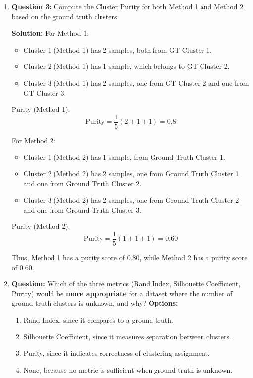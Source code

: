 \documentclass{article}
\begin{document}
\begin{enumerate}
Hence, the silhouette scores for all samples are shown above.

    \item \textbf{Question 3:} \newline
    Compute the Cluster Purity for both Method 1 and Method 2 based on the ground truth clusters.
    
    \textbf{Solution:} \newline
    For Method 1:
    \begin{itemize}
        \item Cluster 1 (Method 1) has 2 samples, both from GT Cluster 1.
        \item Cluster 2 (Method 1) has 1 sample, which belongs to GT Cluster 2.
        \item Cluster 3 (Method 1) has 2 samples, one from GT Cluster 2 and one from GT Cluster 3.
    \end{itemize}
    
    Purity (Method 1):
    \[
    \text{Purity} = \frac{1}{5} (2 + 1 + 1) = 0.8
    \]
    
    For Method 2:
    \begin{itemize}
        \item Cluster 1 (Method 2) has 1 sample, from Ground Truth Cluster 1.
        \item Cluster 2 (Method 2) has 2 samples, one from Ground Truth Cluster 1 and one from Ground Truth Cluster 2.
        \item Cluster 3 (Method 2) has 2 samples, one from Ground Truth Cluster 2 and one from Ground Truth Cluster 3.
    \end{itemize}
    
    Purity (Method 2):
    \[
    \text{Purity} = \frac{1}{5} (1 + 1 + 1) = 0.60
    \]
    
    Thus, Method 1 has a purity score of 0.80, while Method 2 has a purity score of 0.60.
    

    \item \textbf{Question:} \newline
    Which of the three metrics (Rand Index, Silhouette Coefficient, Purity) would be \textbf{more appropriate} for a dataset where the number of ground truth clusters is unknown, and why?
    \newline \newline
    \textbf{Options:}
    \begin{enumerate}
        \item Rand Index, since it compares to a ground truth.
        \item Silhouette Coefficient, since it measures separation between clusters.
        \item Purity, since it indicates correctness of clustering assignment.
        \item None, because no metric is sufficient when ground truth is unknown.
    \end{enumerate}
    

\end{enumerate}
\end{document}
